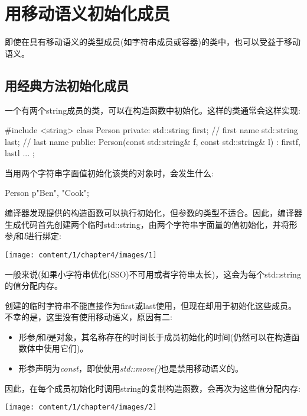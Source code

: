 \section{用移动语义初始化成员}
即使在具有移动语义的类型成员(如字符串成员或容器)的类中，也可以受益于移动语义。

\subsection{用经典方法初始化成员}

一个有两个string成员的类，可以在构造函数中初始化。这样的类通常会这样实现:

\begin{cppcode}
#include <string>
class Person {
private:
	std::string first; // first name
	std::string last; // last name
public:
	Person(const std::string& f, const std::string& l)
	: first{f}, last{l} {
	}
	...
};
\end{cppcode}

当用两个字符串字面值初始化该类的对象时，会发生什么:

\begin{cppcode}
Person p{"Ben", "Cook"};
\end{cppcode}

编译器发现提供的构造函数可以执行初始化，但参数的类型不适合。因此，编译器生成代码首先创建两个临时std::string，由两个字符串字面量的值初始化，并将形参\textit{f}和\textit{l}进行绑定:

\begin{center}
	\texttt{[image: content/1/chapter4/images/1]}
\end{center}

一般来说(如果小字符串优化(SSO)不可用或者字符串太长)，这会为每个std::string的值分配内存。

创建的临时字符串不能直接作为first或last使用，但现在却用于初始化这些成员。不幸的是，这里没有使用移动语义，原因有二:

\begin{itemize}
	\item 形参\textit{f}和\textit{l}是对象，其名称存在的时间长于成员初始化的时间(仍然可以在构造函数体中使用它们)。
	\item 形参声明为\textit{const}，即使使用\textit{std::move()}也是禁用移动语义的。
\end{itemize}

因此，在每个成员初始化时调用string的复制构造函数，会再次为这些值分配内存:

\begin{center}
	\texttt{[image: content/1/chapter4/images/2]}
\end{center}

